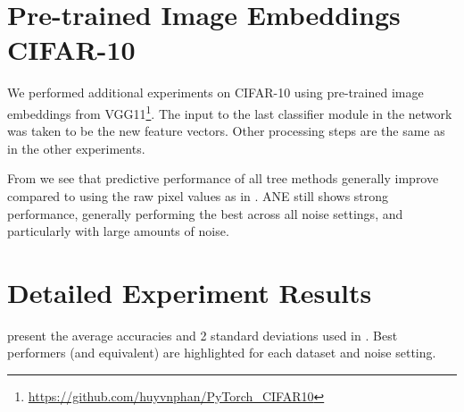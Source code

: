 \documentclass[letterpaper]{article} %
\begin{document}
\section{Pre-trained Image Embeddings CIFAR-10}
\label{app:cifar10-pretrained}


We performed additional experiments on CIFAR-10 using pre-trained image embeddings from VGG11\footnote{\url{https://github.com/huyvnphan/PyTorch_CIFAR10}}. 
The input to the last classifier module in the network was taken to be the new feature vectors.
Other processing steps are the same as in the other experiments.


From 
we see that predictive performance of all tree methods generally improve compared to using the raw pixel values as in . 
ANE still shows strong performance, 
generally performing the best across all noise settings,
and particularly with large amounts of noise.







\section{Detailed Experiment Results}
\label{app:results}

 present the average accuracies and 2 standard deviations 
used in . 
Best performers (and equivalent) are highlighted for each dataset and noise setting.

\end{document}
